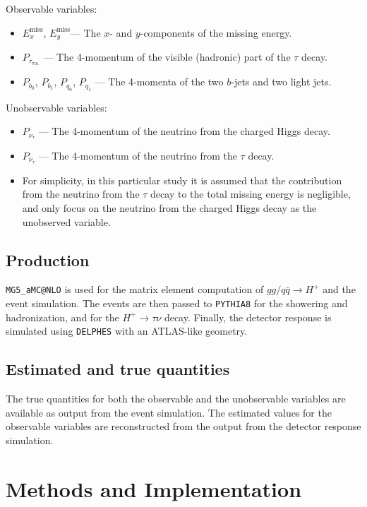 \documentclass[twocolumn]{scrartcl}
\newcommand{\exmiss}{$E_x^\text{miss}$}
\newcommand{\eymiss}{$E_y^\text{miss}$}
\begin{document}
Observable variables:
\begin{itemize}
    \item \exmiss, \eymiss --- The $x$- and $y$-components of the missing energy.
    \item $P_{\tau_\mathrm{vis.}}$ --- The 4-momentum of the visible (hadronic) part of the $\tau$ decay.
    \item $P_{b_0}$, $P_{b_1}$, $P_{q_0}$, $P_{q_1}$ --- The 4-momenta of the two $b$-jets and two light jets.
\end{itemize}

Unobservable variables:
\begin{itemize}
    \item $P_{\nu_\tau}$ --- The 4-momentum of the neutrino from the charged Higgs decay.
    \item $P_{\bar\nu_\tau}$ --- The 4-momentum of the neutrino from the $\tau$ decay.
    \item For simplicity, in this particular study it is assumed that the contribution from the neutrino from the $\tau$ decay to the total missing energy is negligible, and only focus on the neutrino from the charged Higgs decay as the unobserved variable. 
\end{itemize}

\subsection{Production}
\texttt{MG5\_aMC@NLO} \cite{Alwall:2014hca} is used for the matrix element computation of $gg / q \bar q \to H^+$ and the event simulation. The events are then passed to \texttt{PYTHIA8} \cite{Sjöstrand2015159} for the showering and hadronization, and for the $H^+\to \tau\nu$ decay. Finally, the detector response is simulated using \texttt{DELPHES} \cite{Favereau2014} with an ATLAS-like geometry.

\subsection{Estimated and true quantities}
The true quantities for both the observable and the unobservable variables are available as output from the event simulation. The estimated values for the observable variables are reconstructed from the output from the detector response simulation.

\section{Methods and Implementation}
\end{document}
